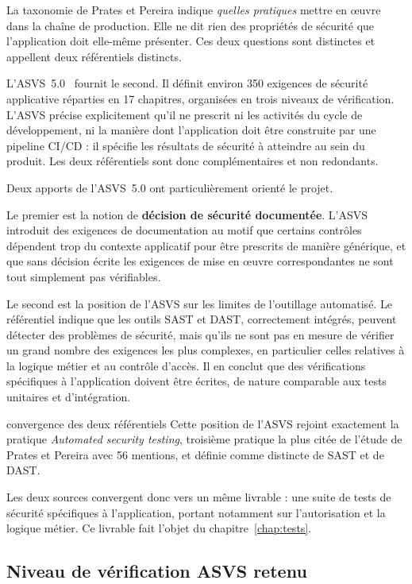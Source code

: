 La taxonomie de Prates et Pereira indique \emph{quelles pratiques} mettre en
œuvre dans la chaîne de production. Elle ne dit rien des propriétés de sécurité
que l'application doit elle-même présenter. Ces deux questions sont distinctes et
appellent deux référentiels distincts.

L'ASVS~5.0~\cite{owaspasvs5} fournit le second. Il définit environ 350 exigences
de sécurité applicative réparties en 17 chapitres, organisées en trois niveaux
de vérification. L'ASVS précise explicitement qu'il ne prescrit ni les activités
du cycle de développement, ni la manière dont l'application doit être construite
par une pipeline CI/CD : il spécifie les résultats de sécurité à atteindre au
sein du produit. Les deux référentiels sont donc complémentaires et non
redondants.

Deux apports de l'ASVS~5.0 ont particulièrement orienté le projet.

Le premier est la notion de \textbf{décision de sécurité documentée}. L'ASVS
introduit des exigences de documentation au motif que certains contrôles
dépendent trop du contexte applicatif pour être prescrits de manière générique,
et que sans décision écrite les exigences de mise en œuvre correspondantes ne
sont tout simplement pas vérifiables.

Le second est la position de l'ASVS sur les limites de l'outillage automatisé.
Le référentiel indique que les outils SAST et DAST, correctement intégrés,
peuvent détecter des problèmes de sécurité, mais qu'ils ne sont pas en mesure de
vérifier un grand nombre des exigences les plus complexes, en particulier celles
relatives à la logique métier et au contrôle d'accès. Il en conclut que des
vérifications spécifiques à l'application doivent être écrites, de nature
comparable aux tests unitaires et d'intégration.

\begin{constat}{convergence des deux référentiels}
Cette position de l'ASVS rejoint exactement la pratique 
\emph{Automated security testing}, troisième pratique la plus citée de l'étude
de Prates et Pereira avec 56 mentions, et définie comme distincte de SAST et de
DAST.

Les deux sources convergent donc vers un même livrable : une suite de tests de
sécurité spécifiques à l'application, portant notamment sur l'autorisation et
la logique métier. Ce livrable fait l'objet du chapitre~\ref{chap:tests}.
\end{constat}

\subsection{Niveau de vérification ASVS retenu}

